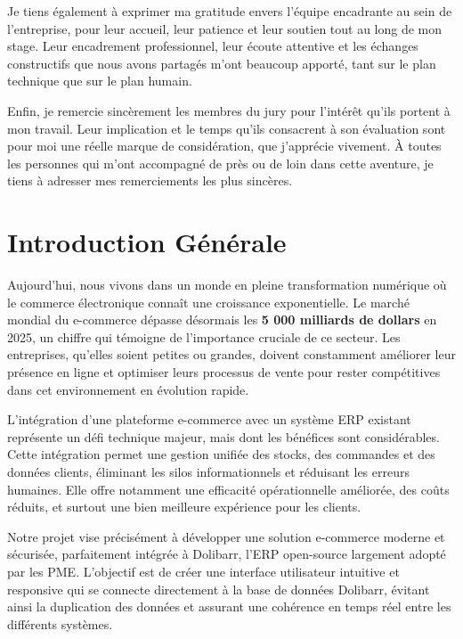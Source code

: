 \documentclass[12pt,a4paper]{report}
\begin{document}
Je tiens également à exprimer ma gratitude envers l’équipe encadrante au sein de l’entreprise, pour leur accueil, leur patience et leur soutien tout au long de mon stage. Leur encadrement professionnel, leur écoute attentive et les échanges constructifs que nous avons partagés m’ont beaucoup apporté, tant sur le plan technique que sur le plan humain.

Enfin, je remercie sincèrement les membres du jury pour l’intérêt qu’ils portent à mon travail. Leur implication et le temps qu’ils consacrent à son évaluation sont pour moi une réelle marque de considération, que j’apprécie vivement. À toutes les personnes qui m’ont accompagné de près ou de loin dans cette aventure, je tiens à adresser mes remerciements les plus sincères.
\cleardoublepage



\setcounter{page}{1}
\tableofcontents
\cleardoublepage

\listoffigures
\cleardoublepage

\listoftables
\cleardoublepage
{}
\setcounter{page}{1}
\chapter{Introduction Générale}
\vspace{0.5cm}

\begin{minipage}{\textwidth}
\setlength{\parindent}{0.5cm}
\setlength{\parskip}{1em}  %
\linespread{1.4}          %
\fontsize{11}{14}\selectfont %

Aujourd'hui, nous vivons dans un monde en pleine transformation numérique où le commerce électronique connaît une croissance exponentielle. Le marché mondial du e-commerce dépasse désormais les \textbf{5 000 milliards de dollars} en 2025, un chiffre qui témoigne de l'importance cruciale de ce secteur. Les entreprises, qu'elles soient petites ou grandes, doivent constamment améliorer leur présence en ligne et optimiser leurs processus de vente pour rester compétitives dans cet environnement en évolution rapide.

L'intégration d'une plateforme e-commerce avec un système ERP existant représente un défi technique majeur, mais dont les bénéfices sont considérables. Cette intégration permet une gestion unifiée des stocks, des commandes et des données clients, éliminant les silos informationnels et réduisant les erreurs humaines. Elle offre notamment une efficacité opérationnelle améliorée, des coûts réduits, et surtout une bien meilleure expérience pour les clients.

Notre projet vise précisément à développer une solution e-commerce moderne et sécurisée, parfaitement intégrée à Dolibarr, l'ERP open-source largement adopté par les PME. L'objectif est de créer une interface utilisateur intuitive et responsive qui se connecte directement à la base de données Dolibarr, évitant ainsi la duplication des données et assurant une cohérence en temps réel entre les différents systèmes.
\end{minipage}
\end{document}
